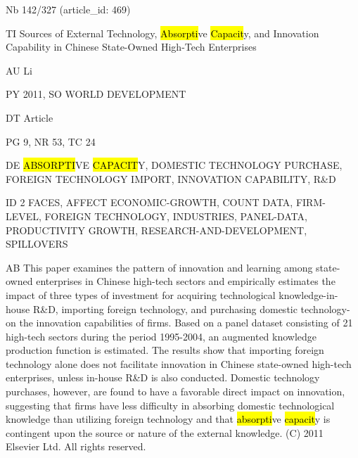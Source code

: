 \documentclass[a4paper]{article}
\begin{document}
\vspace*{-2cm}
Nb \tabto{0cm}142/327 (article\_id: 469)\par
TI \tabto{0cm}Sources of External Technology, \hl{Absorpti}ve \hl{Capacit}y, and Innovation Capability in Chinese State-Owned High-Tech Enterprises\par
AU \tabto{0cm}Li\par
PY \tabto{0cm}2011, SO WORLD DEVELOPMENT\par
DT \tabto{0cm}Article\par
PG \tabto{0cm}9, NR 53, TC 24\par
DE \tabto{0cm}\hl{ABSORPTI}VE \hl{CAPACIT}Y, DOMESTIC TECHNOLOGY PURCHASE, FOREIGN TECHNOLOGY IMPORT, INNOVATION CAPABILITY, R\&D\par
ID \tabto{0cm}2 FACES, AFFECT ECONOMIC-GROWTH, COUNT DATA, FIRM-LEVEL, FOREIGN TECHNOLOGY, INDUSTRIES, PANEL-DATA, PRODUCTIVITY GROWTH, RESEARCH-AND-DEVELOPMENT, SPILLOVERS\par
AB \tabto{0cm}This paper examines the pattern of innovation and learning among state-owned enterprises in Chinese high-tech sectors and empirically estimates the impact of three types of investment for acquiring technological knowledge-in-house R\&D, importing foreign technology, and purchasing domestic technology-on the innovation capabilities of firms. Based on a panel dataset consisting of 21 high-tech sectors during the period 1995-2004, an augmented knowledge production function is estimated. The results show that importing foreign technology alone does not facilitate innovation in Chinese state-owned high-tech enterprises, unless in-house R\&D is also conducted. Domestic technology purchases, however, are found to have a favorable direct impact on innovation, suggesting that firms have less difficulty in absorbing domestic technological knowledge than utilizing foreign technology and that \hl{absorpti}ve \hl{capacit}y is contingent upon the source or nature of the external knowledge. (C) 2011 Elsevier Ltd. All rights reserved.\par
\clearpage
\end{document}
